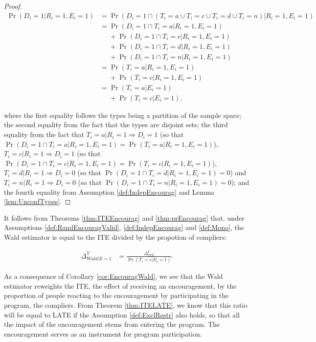 \documentclass[]{book}
\theoremstyle{definition}
\theoremstyle{definition}
\theoremstyle{definition}
\theoremstyle{remark}
\let\BeginKnitrBlock\begin \let\EndKnitrBlock\end
\begin{document}
\BeginKnitrBlock{proof}
\iffalse{} {Proof. } \fi{}

\begin{align*}
 \Pr(D_i=1|R_i=1,E_i=1) & =\Pr(D_i=1\cap (T_i=a\cup T_i=c\cup T_i=d\cup T_i=n)|R_i=1,E_i=1) \\
                        & = \Pr(D_i=1\cap T_i=a|R_i=1,E_i=1)\\
                        & \phantom{=}+ \Pr(D_i=1\cap T_i=c|R_i=1,E_i=1)\\
                        & \phantom{=} +\Pr(D_i=1\cap T_i=d|R_i=1,E_i=1)\\
                        & \phantom{=} +\Pr(D_i=1\cap T_i=n|R_i=1,E_i=1)\\
                        & = \Pr(T_i=a|R_i=1,E_i=1)\\
                        & \phantom{=} +\Pr(T_i=c|R_i=1,E_i=1)\\
                        & = \Pr(T_i=a|E_i=1)\\
                        & \phantom{=} +\Pr(T_i=c|E_i=1),
\end{align*}

where the first equality follows the types being a partition of the
sample space; the second equality from the fact that the types are
disjoint sets; the third equality from the fact that
\(T_i=a|R_i=1 \Rightarrow D_i=1\) (so that
\(\Pr(D_i=1\cap T_i=a|R_i=1,E_i=1)=\Pr(T_i=a|R_i=1,E_i=1)\)),
\(T_i=c|R_i=1 \Rightarrow D_i=1\) (so that
\(\Pr(D_i=1\cap T_i=c|R_i=1,E_i=1)=\Pr(T_i=c|R_i=1,E_i=1)\)),
\(T_i=d|R_i=1 \Rightarrow D_i=0\) (so that
\(\Pr(D_i=1\cap T_i=d|R_i=1,E_i=1)=0\)) and
\(T_i=n|R_i=1 \Rightarrow D_i=0\) (so that
\(\Pr(D_i=1\cap T_i=n|R_i=1,E_i=1)=0\)); and the fourth equality from
Assumption \ref{def:IndepEncourag} and Lemma \ref{lem:UnconfTypes}.
\EndKnitrBlock{proof}

\BeginKnitrBlock{corollary}[Wald estimator and ITE]
\protect\hypertarget{cor:EncouragWald}{}{\label{cor:EncouragWald}
\iffalse (Wald estimator and ITE) \fi{} }It follows from Theorems
\ref{thm:ITEEncourag} and \ref{thm:prEncourag} that, under Assumptions
\ref{def:RandEncouragValid}, \ref{def:IndepEncourag} and \ref{def:Mono},
the Wald estimator is equal to the ITE divided by the propotion of
compliers:

\begin{align*}
  \Delta^Y_{Wald|E=1} & = \frac{\Delta^Y_{ITE}}{\Pr(T_i=c|E_i=1)}.
\end{align*}
\EndKnitrBlock{corollary}

As a consequence of Corollary \ref{cor:EncouragWald}, we see that the
Wald estimator reweights the ITE, the effect of receiving an
encouragement, by the proportion of people reacting to the encouragement
by participating in the program, the compliers. From Theorem
\ref{thm:ITELATE}, we know that this ratio will be equal to LATE if the
Assumption \ref{def:ExclRestr} also holds, so that all the impact of the
encouragement stems from entering the program. The encouragement serves
as an instrument for program participation.
\end{document}
